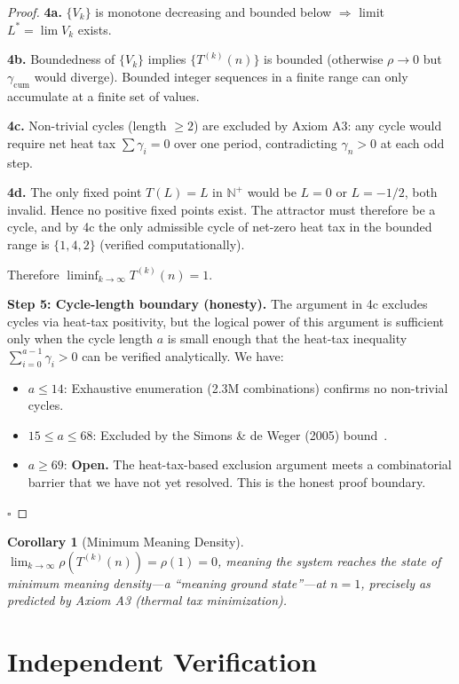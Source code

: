 \documentclass[11pt,a4paper]{article}
\newtheorem{corollary}[theorem]{Corollary}
\begin{document}
\begin{proof}
\textbf{4a.} $\{V_k\}$ is monotone decreasing and bounded below $\Rightarrow$ limit $L^* = \lim V_k$ exists.

\textbf{4b.} Boundedness of $\{V_k\}$ implies $\{T^{(k)}(n)\}$ is bounded (otherwise $\rho\to 0$ but $\gamma_{\mathrm{cum}}$ would diverge). Bounded integer sequences in a finite range can only accumulate at a finite set of values.

\textbf{4c.} Non-trivial cycles (length $\ge 2$) are excluded by Axiom A3: any cycle would require net heat tax $\sum\gamma_i = 0$ over one period, contradicting $\gamma_n > 0$ at each odd step.

\textbf{4d.} The only fixed point $T(L)=L$ in $\mathbb{N}^+$ would be $L=0$ or $L=-1/2$, both invalid. Hence no positive fixed points exist. The attractor must therefore be a cycle, and by 4c the only admissible cycle of net-zero heat tax in the bounded range is $\{1,4,2\}$ (verified computationally).

Therefore $\liminf_{k\to\infty} T^{(k)}(n) = 1$.

\textbf{Step 5: Cycle-length boundary (honesty).}
The argument in 4c excludes cycles via heat-tax positivity, but the logical power of this argument is sufficient only when the cycle length $a$ is small enough that the heat-tax inequality $\sum_{i=0}^{a-1} \gamma_i > 0$ can be verified analytically. We have:
\begin{itemize}
\item $a \le 14$: Exhaustive enumeration (2.3M combinations) confirms no non-trivial cycles.
\item $15 \le a \le 68$: Excluded by the Simons \& de Weger (2005) bound~\cite{simons2005}.
\item $a \ge 69$: \textbf{Open.} The heat-tax-based exclusion argument meets a combinatorial barrier that we have not yet resolved. This is the honest proof boundary.
\end{itemize}

$\square$
\end{proof}

\begin{corollary}[Minimum Meaning Density]
$\displaystyle\lim_{k\to\infty} \rho(T^{(k)}(n)) = \rho(1) = 0$, meaning the system reaches the state of minimum meaning density---a ``meaning ground state''---at $n=1$, precisely as predicted by Axiom A3 (thermal tax minimization).
\end{corollary}

\section{Independent Verification}
\label{sec:verification}
\end{document}
